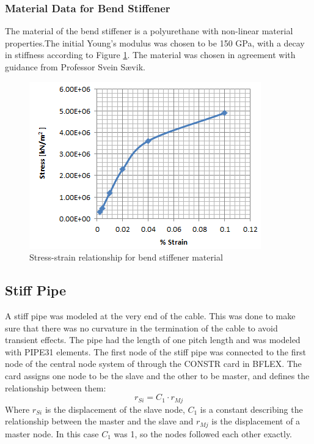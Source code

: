\subsubsection{Material Data for Bend Stiffener}
The material of the bend stiffener is a polyurethane with non-linear material properties.The initial Young's modulus was chosen to be 150 GPa, with a decay in stiffness according to  Figure \ref{fig:matbend}. The material was chosen in agreement with guidance from Professor Svein Sævik. 

\begin{figure}[H]
\centering
\includegraphics[scale=0.8]{figures/matbend}
\caption[$\; \:$ Stress-strain relationship for bend stiffener material]{Stress-strain relationship for bend stiffener material}
 \label{fig:matbend}
\end{figure}

\subsection{Stiff Pipe}
A stiff pipe was modeled at the very end of the cable. This was done to make sure that there was no curvature in the termination of the cable to avoid transient effects. The pipe had the length of one pitch length and was modeled with PIPE31 elements. The first node of the stiff pipe was connected to the first node of the central node system of through the CONSTR card in BFLEX. The card assigns one node to be the slave and the other to be master, and defines the relationship between them:
\begin{equation}
r_{Si}=C_1 \cdot r_{Mj}    
\end{equation}
Where $r_{Si}$ is the displacement of the slave node,  $C_1$ is a constant describing the relationship between the master and the slave and $r_{Mj}$ is the displacement of a master node.\newline 
\newline 
In this case $C_1$ was 1, so the nodes followed each other exactly. 

